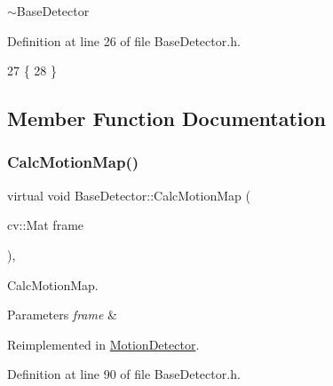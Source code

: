 $\sim$\+Base\+Detector 



Definition at line 26 of file Base\+Detector.\+h.


\begin{DoxyCode}
27     \{
28     \}
\end{DoxyCode}


\subsection{Member Function Documentation}
\mbox{\label{class_base_detector_a73c66f0d4dad263fcf65c09a6f6feda2}} 
\subsubsection{\texorpdfstring{Calc\+Motion\+Map()}{CalcMotionMap()}}
{\footnotesize\ttfamily virtual void Base\+Detector\+::\+Calc\+Motion\+Map (\begin{DoxyParamCaption}\item[{cv\+::\+Mat}]{frame }\end{DoxyParamCaption})\hspace{0.3cm}{\ttfamily [inline]}, {\ttfamily [virtual]}}



Calc\+Motion\+Map. 


\begin{DoxyParams}{Parameters}
{\em frame} & \\
\hline
\end{DoxyParams}


Reimplemented in \mbox{\hyperlink{class_motion_detector_aa4e606acafdc33a3104471903e449adc}{Motion\+Detector}}.



Definition at line 90 of file Base\+Detector.\+h.


